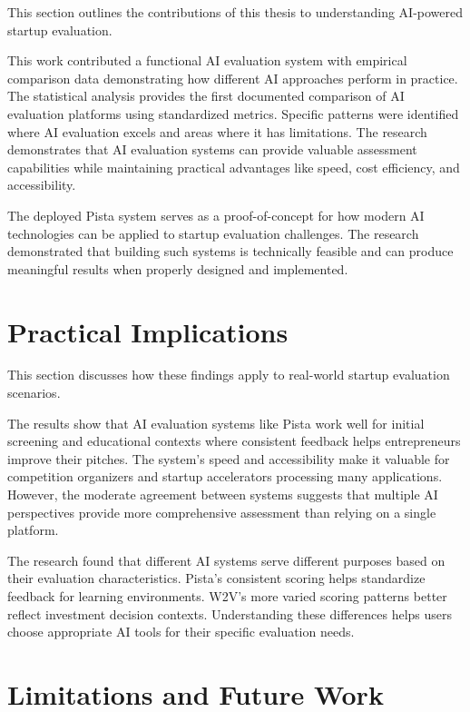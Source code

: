 This section outlines the contributions of this thesis to understanding AI-powered startup evaluation.

This work contributed a functional AI evaluation system with empirical comparison data demonstrating how different AI approaches perform in practice. The statistical analysis provides the first documented comparison of AI evaluation platforms using standardized metrics. Specific patterns were identified where AI evaluation excels and areas where it has limitations. The research demonstrates that AI evaluation systems can provide valuable assessment capabilities while maintaining practical advantages like speed, cost efficiency, and accessibility.

The deployed Pista system serves as a proof-of-concept for how modern AI technologies can be applied to startup evaluation challenges. The research demonstrated that building such systems is technically feasible and can produce meaningful results when properly designed and implemented.

\section{Practical Implications}
\label{sec:implications}

This section discusses how these findings apply to real-world startup evaluation scenarios.

The results show that AI evaluation systems like Pista work well for initial screening and educational contexts where consistent feedback helps entrepreneurs improve their pitches. The system's speed and accessibility make it valuable for competition organizers and startup accelerators processing many applications. However, the moderate agreement between systems suggests that multiple AI perspectives provide more comprehensive assessment than relying on a single platform.

The research found that different AI systems serve different purposes based on their evaluation characteristics. Pista's consistent scoring helps standardize feedback for learning environments. W2V's more varied scoring patterns better reflect investment decision contexts. Understanding these differences helps users choose appropriate AI tools for their specific evaluation needs.

\section{Limitations and Future Work}
\label{sec:limitations}

